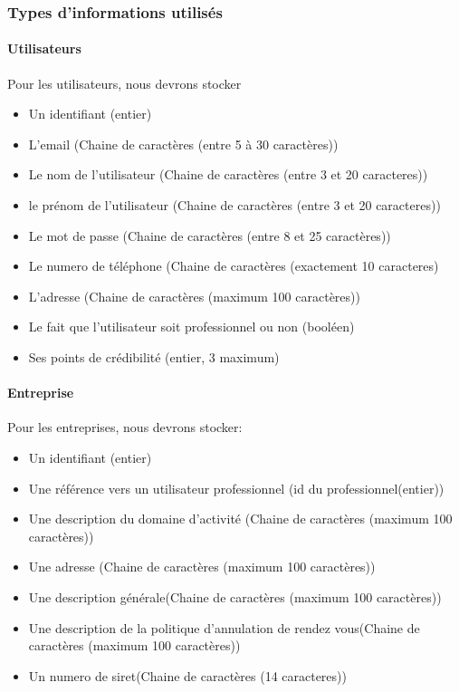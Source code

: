 \documentclass{article}
\begin{document}
\subsubsection{Types d'informations utilisés}
\paragraph{Utilisateurs}
Pour les utilisateurs, nous devrons stocker
\begin{itemize}
\item Un identifiant (entier)
\item L'email (Chaine de caractères (entre 5 à 30 caractères))
\item Le nom de l'utilisateur (Chaine de caractères (entre 3 et 20 caracteres))
\item le prénom de l'utilisateur (Chaine de caractères (entre 3 et 20 caracteres))
\item Le mot de passe (Chaine de caractères (entre 8 et 25 caractères))
\item Le numero de téléphone (Chaine de caractères (exactement 10 caracteres)
\item L'adresse (Chaine de caractères (maximum 100 caractères))
\item Le fait que l'utilisateur soit professionnel ou non (booléen)
\item Ses points de crédibilité (entier, 3 maximum)
\end{itemize}

\paragraph{Entreprise}
Pour les entreprises, nous devrons stocker:
\begin{itemize}
\item Un identifiant (entier)
\item Une référence vers un utilisateur professionnel (id du professionnel(entier)) 
\item Une description du domaine d'activité (Chaine de caractères (maximum 100 caractères))
\item Une adresse (Chaine de caractères (maximum 100 caractères))
\item Une description générale(Chaine de caractères (maximum 100 caractères))
\item Une description de la politique d'annulation de rendez vous(Chaine de caractères (maximum 100 caractères))
\item Un numero de siret(Chaine de caractères (14 caracteres))
\end{itemize}
\end{document}
